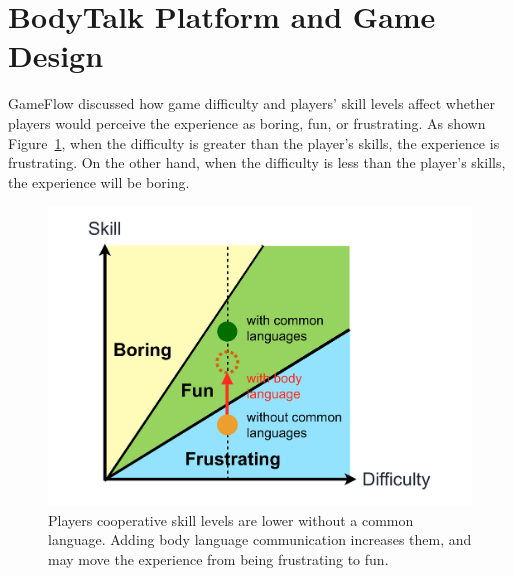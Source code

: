\section{BodyTalk Platform and Game Design}



GameFlow\cite{GD1} discussed how game difficulty and players' skill levels affect whether players would perceive the experience as boring, fun, or frustrating. As shown Figure~\ref{fig:GD_F1}, when the difficulty is greater than the player's skills, the experience is frustrating. On the other hand, when the difficulty is less than the player's skills, the experience will be boring.


\begin{figure}[!b]
\centering
\includegraphics[width=0.9\columnwidth]{Figures/GD_F1.pdf}
\caption{Players cooperative skill levels are lower without a common language. Adding body language communication increases them, and may move the experience from being frustrating to fun.}
\label{fig:GD_F1}
\end{figure}


